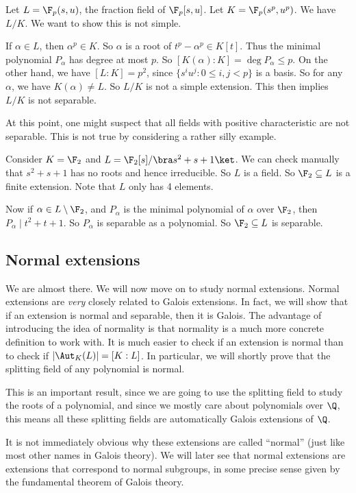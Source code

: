 \documentclass[a4paper]{article}
\begin{document}
\begin{eg}
  Let $L = \F_p(s, u)$, the fraction field of $\F_p[s, u]$. Let $K = \F_p(s^p, u^p)$. We have $L/K$. We want to show this is not simple.

  If $\alpha \in L$, then $\alpha^p \in K$. So $\alpha$ is a root of $t^p - \alpha^p \in K[t]$. Thus the minimal polynomial $P_\alpha$ has degree at most $p$. So $[K(\alpha): K] = \deg P_\alpha \leq p$. On the other hand, we have $[L:K] = p^2$, since $\{s^iu^j: 0 \leq i, j < p\}$ is a basis. So for any $\alpha$, we have $K(\alpha) \not= L$. So $L/K$ is not a simple extension. This then implies $L/K$ is not separable.
\end{eg}
At this point, one might suspect that all fields with positive characteristic are not separable. This is not true by considering a rather silly example.
\begin{eg}
  Consider $K = \F_2$ and $L = \F_2[s]/\bra s^2 + s + 1\ket$. We can check manually that $s^2 + s + 1$ has no roots and hence irreducible. So $L$ is a field. So $\F_2 \subseteq L$ is a finite extension. Note that $L$ only has 4 elements.

  Now if $\alpha \in L \setminus \F_2$, and $P_\alpha$ is the minimal polynomial of $\alpha$ over $\F_2$, then $P_\alpha\mid t^2 + t + 1$. So $P_\alpha$ is separable as a polynomial. So $\F_2 \subseteq L$ is separable.
\end{eg}

\subsection{Normal extensions}
We are almost there. We will now move on to study normal extensions. Normal extensions are \emph{very} closely related to Galois extensions. In fact, we will show that if an extension is normal and separable, then it is Galois. The advantage of introducing the idea of normality is that normality is a much more concrete definition to work with. It is much easier to check if an extension is normal than to check if $|\Aut_K(L)| = [K:L]$. In particular, we will shortly prove that the splitting field of any polynomial is normal.

This is an important result, since we are going to use the splitting field to study the roots of a polynomial, and since we mostly care about polynomials over $\Q$, this means all these splitting fields are automatically Galois extensions of $\Q$.

It is not immediately obvious why these extensions are called ``normal'' (just like most other names in Galois theory). We will later see that normal extensions are extensions that correspond to normal subgroups, in some precise sense given by the fundamental theorem of Galois theory.
\end{document}
